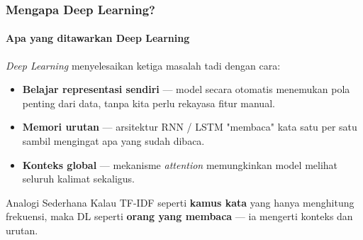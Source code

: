 \documentclass[t,aspectratio=169,xcolor=dvipsnames]{beamer}
\begin{document}
\begin{frame}
    \frametitle{Mengapa Deep Learning?}
    \framesubtitle{Apa yang ditawarkan Deep Learning}
    \small
    \textit{Deep Learning} menyelesaikan ketiga masalah tadi dengan cara:
    \vspace{0.3em}
    \begin{itemize}
        \item \textbf{Belajar representasi sendiri} — model secara otomatis menemukan pola penting dari data, tanpa kita perlu rekayasa fitur manual.
        \item \textbf{Memori urutan} — arsitektur RNN / LSTM "membaca" kata satu per satu sambil mengingat apa yang sudah dibaca.
        \item \textbf{Konteks global} — mekanisme \textit{attention} memungkinkan model melihat seluruh kalimat sekaligus.
    \end{itemize}
    \begin{exampleblock}{Analogi Sederhana}
        Kalau TF-IDF seperti \textbf{kamus kata} yang hanya menghitung frekuensi, maka DL seperti \textbf{orang yang membaca} — ia mengerti konteks dan urutan.
    \end{exampleblock}
\end{frame}

\end{document}
